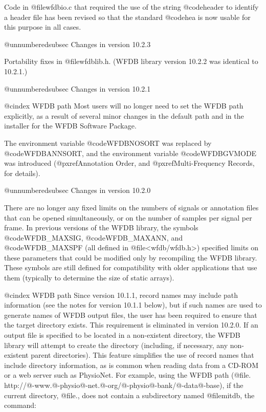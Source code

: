 Code in @file{wfdbio.c} that required the use of the string
@code{header} to identify a header file has been revised so that the
standard @code{hea} is now usable for this purpose in all cases.

@unnumberedsubsec Changes in version 10.2.3

Portability fixes in @file{wfdblib.h}.  (WFDB library version 10.2.2 was
identical to 10.2.1.)

@unnumberedsubsec Changes in version 10.2.1

@cindex WFDB path
Most users will no longer need to set the WFDB path explicitly, as a result
of several minor changes in the default path and in the installer for the
WFDB Software Package.

The environment variable @code{WFDBNOSORT} was replaced by @code{WFDBANNSORT},
and the environment variable @code{WFDBGVMODE} was introduced
(@pxref{Annotation Order}, and @pxref{Multi-Frequency Records}, for details).

@unnumberedsubsec Changes in version 10.2.0

There are no longer any fixed limits on the numbers of signals or annotation
files that can be opened simultaneously, or on the number of samples per signal
per frame.  In previous versions of the WFDB library, the symbols
@code{WFDB_MAXSIG}, @code{WFDB_MAXANN}, and @code{WFDB_MAXSPF} (all defined in
@file{<wfdb/wfdb.h>}) specified limits on these parameters that could be
modified only by recompiling the WFDB library.  These symbols are still defined
for compatibility with older applications that use them (typically to determine
the size of static arrays).

@cindex WFDB path
Since version 10.1.1, record names may include path information (see the notes
for version 10.1.1 below), but if such names are used to generate names of WFDB
output files, the user has been required to ensure that the target directory
exists.  This requirement is eliminated in version 10.2.0.  If an output file
is specified to be located in a non-existent directory, the WFDB library will
attempt to create the directory (including, if necessary, any non-existent
parent directories).  This feature simplifies the use of record names that
include directory information, as is common when reading data from a CD-ROM or
a web server such as PhysioNet.  For example, using the WFDB path
(@file{. http://@-www.@-physio@-net.@-org/@-physio@-bank/@-data@-base}), if the
current directory, @file{.}, does not contain a subdirectory named
@file{mitdb}, the command:

